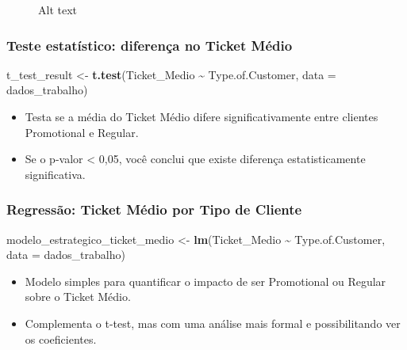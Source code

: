 \documentclass[
]{article}
\makeatletter
\newenvironment{Shaded}{\begin{snugshade}}{\end{snugshade}}
\newcommand{\AttributeTok}[1]{\textcolor[rgb]{0.13,0.29,0.53}{#1}}
\newcommand{\FunctionTok}[1]{\textcolor[rgb]{0.13,0.29,0.53}{\textbf{#1}}}
\newcommand{\NormalTok}[1]{#1}
\newcommand{\OtherTok}[1]{\textcolor[rgb]{0.56,0.35,0.01}{#1}}
\newcommand{\SpecialCharTok}[1]{\textcolor[rgb]{0.81,0.36,0.00}{\textbf{#1}}}
\newcommand*\pandocbounded[1]{%
  \sbox\pandoc@box{#1}%
  \Gscale@div\@tempa{\textheight}{\dimexpr\ht\pandoc@box+\dp\pandoc@box\relax}%
  \Gscale@div\@tempb{\linewidth}{\wd\pandoc@box}%
  \ifdim\@tempb\p@<\@tempa\p@\let\@tempa\@tempb\fi%
  \ifdim\@tempa\p@<\p@\scalebox{\@tempa}{\usebox\pandoc@box}%
  \else\usebox{\pandoc@box}%
  \fi%
}
\makeatother
\begin{document}
\begin{figure}
\centering
\pandocbounded{\texttt{[image: 15.png]}}
\caption{Alt text}
\end{figure}

\subsubsection{Teste estatístico: diferença no Ticket
Médio}\label{teste-estatuxedstico-diferenuxe7a-no-ticket-muxe9dio}

\begin{Shaded}
\begin{Highlighting}[]
\NormalTok{t\_test\_result }\OtherTok{\textless{}{-}} \FunctionTok{t.test}\NormalTok{(Ticket\_Medio }\SpecialCharTok{\textasciitilde{}}\NormalTok{ Type.of.Customer, }\AttributeTok{data =}\NormalTok{ dados\_trabalho)}
\end{Highlighting}
\end{Shaded}

\begin{itemize}
\item
  Testa se a média do Ticket Médio difere significativamente entre
  clientes Promotional e Regular.
\item
  Se o p-valor \textless{} 0,05, você conclui que existe diferença
  estatisticamente significativa.
\end{itemize}

\subsubsection{Regressão: Ticket Médio por Tipo de
Cliente}\label{regressuxe3o-ticket-muxe9dio-por-tipo-de-cliente}

\begin{Shaded}
\begin{Highlighting}[]
\NormalTok{modelo\_estrategico\_ticket\_medio }\OtherTok{\textless{}{-}} \FunctionTok{lm}\NormalTok{(Ticket\_Medio }\SpecialCharTok{\textasciitilde{}}\NormalTok{ Type.of.Customer, }\AttributeTok{data =}\NormalTok{ dados\_trabalho)}
\end{Highlighting}
\end{Shaded}

\begin{itemize}
\item
  Modelo simples para quantificar o impacto de ser Promotional ou
  Regular sobre o Ticket Médio.
\item
  Complementa o t-test, mas com uma análise mais formal e possibilitando
  ver os coeficientes.
\end{itemize}
\end{document}
